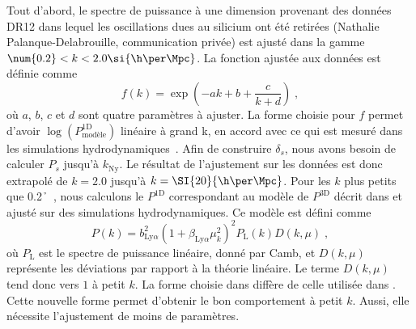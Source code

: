Tout d'abord, le spectre de puissance à une dimension provenant des données DR12 dans lequel les oscillations dues au silicium ont été retirées (Nathalie Palanque-Delabrouille, communication privée) est ajusté dans la gamme $\num{0.2} < k < {2.0} \si{\h\per\Mpc}$.
La fonction ajustée aux données est définie comme
\begin{equation}
  \label{eq:p1d_data}
  f(k) = \exp(- a k + b + \frac{c}{k + d})  \; ,
\end{equation}
où $a$, $b$, $c$ et $d$ sont quatre paramètres à ajuster.
La forme choisie pour $f$ permet d'avoir $\log(P^{\mathrm{1D}}_{\mathrm{modèle}})$ linéaire à grand k, en accord avec ce qui est mesuré dans les simulations hydrodynamiques~\autocite{Arinyo-i-Prats2015}.
Afin de construire $\delta_s$, nous avons besoin de calculer $P_{s}$ jusqu'à $k_{\mathrm{Ny}}$.
Le résultat de l'ajustement sur les données est donc extrapolé de $k = \num{2.0}$ jusqu'à $k = \SI{20}{\h\per\Mpc}$.
Pour les $k$ plus petits que \SI{0.2}{\h\per\Mpc}, nous calculons le $P^{\mathrm{1D}}$ correspondant au modèle de $P^{\mathrm{3D}}$ décrit dans \textcite{Arinyo-i-Prats2015} et ajusté sur des simulations hydrodynamiques.
Ce modèle est défini comme
\begin{equation}
  P(k) = b_{\mathrm{Ly}\alpha}^2 (1 + \beta_{\mathrm{Ly}\alpha} \mu_k^2)^2 P_{\mathrm{L}}(k) D(k, \mu) \; ,
\end{equation}
où $P_{\mathrm{L}}$ est le spectre de puissance linéaire, donné par Camb, et $D(k,\mu)$ représente les déviations par rapport à la théorie linéaire. Le terme $D(k,\mu)$ tend donc vers $1$ à petit $k$. La forme choisie dans \textcite{Arinyo-i-Prats2015} diffère de celle utilisée dans \textcite{McDonald2003}. Cette nouvelle forme permet d'obtenir le bon comportement à petit $k$. Aussi, elle nécessite l'ajustement de moins de paramètres.
